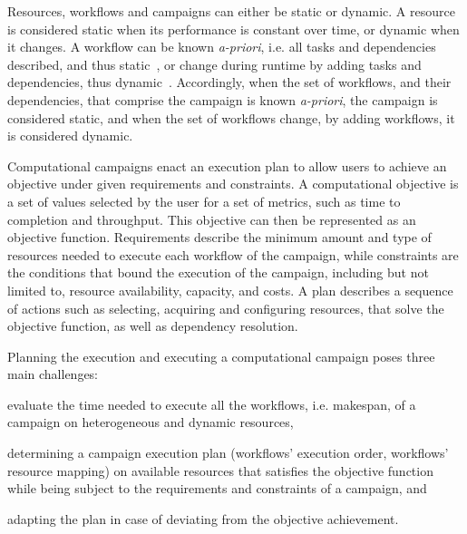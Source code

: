 Resources, workflows and campaigns can either be static or dynamic. A resource 
is considered static when its performance is constant over time, or dynamic when 
it changes. A workflow can be known \textit{a-priori}, i.e. all tasks and 
dependencies described, and thus static~\cite{paraskevakos2019workflow}, or 
change during runtime by adding tasks and dependencies, thus dynamic~\cite{dakka2018high}. 
Accordingly, when the set of workflows, and their dependencies, that comprise 
the campaign is known \textit{a-priori}, the campaign is considered static, and 
when the set of workflows change, by adding workflows, it is considered dynamic.

Computational campaigns enact an execution plan to allow users to achieve an 
objective under given requirements and constraints. A computational objective is 
a set of values selected by the user for a set of metrics, such as time to 
completion and throughput. This objective can then be represented as an objective 
function. Requirements describe the minimum amount and type of resources needed 
to execute each workflow of the campaign, while constraints are the conditions 
that bound the execution of the campaign, including but not limited to, resource 
availability, capacity, and costs. A plan describes a sequence of actions such 
as selecting, acquiring and configuring resources, that solve the objective 
function, as well as dependency resolution.

Planning the execution and executing a computational campaign poses three main 
challenges: 
\begin{inparaenum}[(i)]
\item evaluate the time needed to execute all the workflows, i.e. makespan, of 
a campaign on heterogeneous and dynamic resources,
\item determining a campaign execution plan (workflows’ execution order, 
workflows’ resource mapping) on available resources that satisfies the objective 
function while being subject to the requirements and constraints of a campaign, 
and
\item adapting the plan in case of deviating from the objective achievement.
\end{inparaenum}

